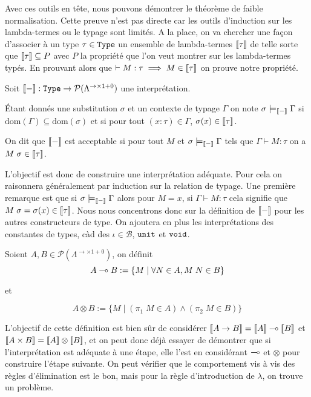 Avec ces outils en tête, nous pouvons démontrer le théorème de faible normalisation. Cette preuve n'est pas directe car les outils d'induction sur les lambda-termes ou le typage sont limités. A la place, on va chercher une façon d'associer à un type $\tau\in\texttt{Type}$ un ensemble de lambda-termes $[\![ \tau ]\!]$ de telle sorte que $[\![ \tau ]\!]\subseteq P$ avec $P$ la propriété que l'on veut montrer sur les lambda-termes typés. En prouvant alors que $\vdash M : \tau\implies M\in[\![ \tau ]\!]$ on prouve notre propriété.

\begin{defi}
    Soit $[\![ - ]\!] : \texttt{Type}\to\mathcal P(\Lambda^{\to\times1+0})$ une interprétation.
    
    \'Etant donnés une substitution $\sigma$ et un contexte de typage $\Gamma$ on note $\sigma\models_{[\![ - ]\!]} \Gamma$ si $\mathrm{dom}(\Gamma)\subseteq \mathrm{dom}(\sigma)$ et si pour tout $(x : \tau) \in\Gamma$, $\sigma(x)\in[\![ \tau ]\!]$.

    On dit que $[\![ - ]\!]$ est acceptable si pour tout $M$ et $\sigma\models_{[\![ - ]\!]}\Gamma$ tels que $\Gamma \vdash M : \tau$ on a $M\;\sigma \in[\![ \tau ]\!]$.
\end{defi}

L'objectif est donc de construire une interprétation adéquate. Pour cela on raisonnera généralement par induction sur la relation de typage. Une première remarque est que si $\sigma\models_{[\![ - ]\!]}\Gamma$ alors pour $M = x$, si $\Gamma\vdash M : \tau$ cela signifie que $M\;\sigma = \sigma(x)\in[\![ \tau ]\!]$. Nous nous concentrons donc sur la définition de $[\![ - ]\!]$ pour les autres constructeurs de type. On ajoutera en plus les interprétations des constantes de types, càd des $\iota\in\mathcal B$, $\texttt{unit}$ et $\texttt{void}$.

\begin{defi}
    Soient $A,B\in\mathcal P(\Lambda^{\to\times1+0})$, on définit $$A\multimap B := \{ M \mid \forall N\in A, M\;N\in B\}$$ \begin{center} et \end{center} $$A\otimes B := \{ M \mid (\pi_1\;M \in A) \land (\pi_2\;M\in B)\}$$
\end{defi}

L'objectif de cette définition est bien sûr de considérer $[\![ A\to B ]\!] = [\![ A ]\!] \multimap [\![ B ]\!]$ et $[\![ A\times B ]\!] = [\![ A ]\!] \otimes [\![ B ]\!]$, et on peut donc déjà essayer de démontrer que si l'interprétation est adéquate à une étape, elle l'est en considérant $\multimap$ et $\otimes$ pour construire l'étape suivante. On peut vérifier que le comportement vis à vis des règles d'élimination est le bon, mais pour la règle d'introduction de $\lambda$, on trouve un problème.

